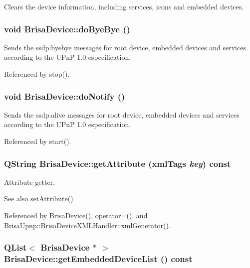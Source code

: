 Clears the device information, including services, icons and embedded devices. \hypertarget{classBrisaUpnp_1_1BrisaDevice_ac0daff83881c5883d9e7f49911c14d4d}{
\subsubsection[{doByeBye}]{\setlength{\rightskip}{0pt plus 5cm}void BrisaDevice::doByeBye ()}}
\label{classBrisaUpnp_1_1BrisaDevice_ac0daff83881c5883d9e7f49911c14d4d}


Sends the ssdp:byebye messages for root device, embedded devices and services according to the UPnP 1.0 especification. 

Referenced by stop().\hypertarget{classBrisaUpnp_1_1BrisaDevice_ac0778c5cb3d7065e795f8dd08e79193b}{
\subsubsection[{doNotify}]{\setlength{\rightskip}{0pt plus 5cm}void BrisaDevice::doNotify ()}}
\label{classBrisaUpnp_1_1BrisaDevice_ac0778c5cb3d7065e795f8dd08e79193b}


Sends the ssdp:alive messages for root device, embedded devices and services according to the UPnP 1.0 especification. 

Referenced by start().\hypertarget{classBrisaUpnp_1_1BrisaDevice_a7abbb69f5552c3fddcf1f31fd394696a}{
\subsubsection[{getAttribute}]{\setlength{\rightskip}{0pt plus 5cm}QString BrisaDevice::getAttribute ({\bf xmlTags} {\em key}) const}}
\label{classBrisaUpnp_1_1BrisaDevice_a7abbb69f5552c3fddcf1f31fd394696a}


Attribute getter. \begin{DoxySeeAlso}{See also}
\hyperlink{classBrisaUpnp_1_1BrisaDevice_a5343b4ea851ba1eb444742df5dc6d3af}{setAttribute()} 
\end{DoxySeeAlso}


Referenced by BrisaDevice(), operator=(), and BrisaUpnp::BrisaDeviceXMLHandler::xmlGenerator().\hypertarget{classBrisaUpnp_1_1BrisaDevice_aca3708629a0be61fd39d551213557a71}{
\subsubsection[{getEmbeddedDeviceList}]{\setlength{\rightskip}{0pt plus 5cm}QList$<$ {\bf BrisaDevice} $\ast$ $>$ BrisaDevice::getEmbeddedDeviceList () const}}
\label{classBrisaUpnp_1_1BrisaDevice_aca3708629a0be61fd39d551213557a71}


